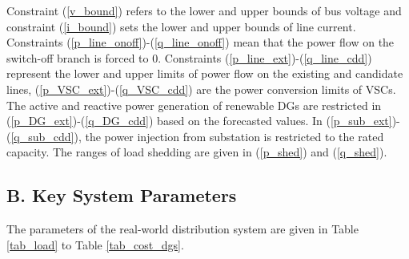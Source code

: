 \documentclass[a4paper,fleqn]{cas-dc}
\begin{document}
{Constraint (\ref{v_bound}) refers to 
the lower and upper bounds of bus voltage and constraint (\ref{i_bound})
sets the lower and upper bounds of line current. Constraints 
(\ref{p_line_onoff})-(\ref{q_line_onoff}) mean that the power flow on the 
switch-off branch is forced to $ 0 $. Constraints
(\ref{p_line_ext})-({\ref{q_line_cdd}}) represent the lower and upper limits
of power flow on the existing and candidate lines, 
(\ref{p_VSC_ext})-({\ref{q_VSC_cdd}}) are the power conversion limits of
VSCs. The active and reactive power generation of renewable DGs are restricted
in (\ref{p_DG_ext})-({\ref{q_DG_cdd}}) based on the forecasted values. In
(\ref{p_sub_ext})-(\ref{q_sub_cdd}), the power injection from substation is 
restricted to the rated capacity. The ranges of load 
shedding are given in (\ref{p_shed}) and (\ref{q_shed}).
}

{\color{blue}
\subsection*{B. Key System Parameters}

The parameters of the real-world distribution system are given in Table 
\ref{tab_load} to Table \ref{tab_cost_dgs}.

}

\setcounter{table}{0}
\renewcommand{\thetable}{B.\arabic{table}}
\end{document}
